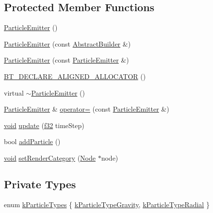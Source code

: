 \subsection*{Protected Member Functions}
\begin{DoxyCompactItemize}
\item 
\mbox{\hyperlink{classnjli_1_1_particle_emitter_a76afac4a484ded180177002f6e91144a}{Particle\+Emitter}} ()
\item 
\mbox{\hyperlink{classnjli_1_1_particle_emitter_aa92c6745c9063ae9598fe22bf3aeea4f}{Particle\+Emitter}} (const \mbox{\hyperlink{classnjli_1_1_abstract_builder}{Abstract\+Builder}} \&)
\item 
\mbox{\hyperlink{classnjli_1_1_particle_emitter_abd233b1c624f6337ef6f58a090aa2a25}{Particle\+Emitter}} (const \mbox{\hyperlink{classnjli_1_1_particle_emitter}{Particle\+Emitter}} \&)
\item 
\mbox{\hyperlink{classnjli_1_1_particle_emitter_a47324e105e9271076815f77f86290534}{B\+T\+\_\+\+D\+E\+C\+L\+A\+R\+E\+\_\+\+A\+L\+I\+G\+N\+E\+D\+\_\+\+A\+L\+L\+O\+C\+A\+T\+OR}} ()
\item 
virtual \mbox{\hyperlink{classnjli_1_1_particle_emitter_a084dd0a9227b5a0e8df4f6d8a83b20cb}{$\sim$\+Particle\+Emitter}} ()
\item 
\mbox{\hyperlink{classnjli_1_1_particle_emitter}{Particle\+Emitter}} \& \mbox{\hyperlink{classnjli_1_1_particle_emitter_a53d9eff68b586bb1cfcf45ebf33712e9}{operator=}} (const \mbox{\hyperlink{classnjli_1_1_particle_emitter}{Particle\+Emitter}} \&)
\item 
\mbox{\hyperlink{_thread_8h_af1e856da2e658414cb2456cb6f7ebc66}{void}} \mbox{\hyperlink{classnjli_1_1_particle_emitter_a725f9fc883364849ab9d69ded574328f}{update}} (\mbox{\hyperlink{_util_8h_a5f6906312a689f27d70e9d086649d3fd}{f32}} time\+Step)
\item 
bool \mbox{\hyperlink{classnjli_1_1_particle_emitter_a9d8b00c1c98fcf2ece111e7b4f432d60}{add\+Particle}} ()
\item 
\mbox{\hyperlink{_thread_8h_af1e856da2e658414cb2456cb6f7ebc66}{void}} \mbox{\hyperlink{classnjli_1_1_particle_emitter_a91475183e7ad0eeb9b5a409f1d8103a2}{set\+Render\+Category}} (\mbox{\hyperlink{classnjli_1_1_node}{Node}} $\ast$node)
\end{DoxyCompactItemize}
\subsection*{Private Types}
\begin{DoxyCompactItemize}
\item 
enum \mbox{\hyperlink{classnjli_1_1_particle_emitter_a5c7255dcebae161993253a14c1c4e097}{k\+Particle\+Types}} \{ \mbox{\hyperlink{classnjli_1_1_particle_emitter_a5c7255dcebae161993253a14c1c4e097a9f4b6e16f6f9761111705e45bf2f7ab0}{k\+Particle\+Type\+Gravity}}, 
\mbox{\hyperlink{classnjli_1_1_particle_emitter_a5c7255dcebae161993253a14c1c4e097abd1df11f6454842ff49cb74f706f5306}{k\+Particle\+Type\+Radial}}
 \}
\end{DoxyCompactItemize}
